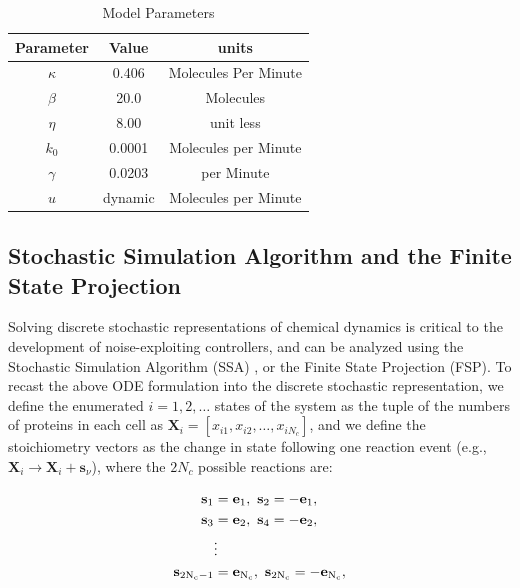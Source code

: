 \documentclass[12pt]{article}
\begin{document}
\begin{table}[]
\caption{Model Parameters}
\begin{center}
\begin{tabular}{|c|c|c|}
\hline
Parameter & Value   & units                     \\ \hline
$\kappa$         & 0.406   & Molecules Per Minute \\
$\beta$          & 20.0    & Molecules            \\
$\eta $           & 8.00    & unit less          \\
$k_0$           & 0.0001  & Molecules per Minute \\
$\gamma$         & 0.0203  & per Minute         \\
$u$              & dynamic & Molecules per Minute \\ \hline
\end{tabular}
\label{table}
\end{center}
\vspace{-0.2in}
\end{table}

\subsection{Stochastic Simulation Algorithm and the Finite State Projection}
Solving discrete stochastic representations of chemical dynamics is critical to the development of noise-exploiting controllers, and can be analyzed using the Stochastic Simulation Algorithm (SSA) , or the Finite State Projection (FSP).
To recast the above ODE formulation into the discrete stochastic representation, we define the enumerated $i = 1,2,\ldots$ states of the system as the tuple of the numbers of proteins in each cell as $\mathbf{X}_i = [x_{i1},x_{i2},\ldots,x_{iN_c}]$, and we define the stoichiometry vectors as the change in state following one reaction event (e.g., $\mathbf{X}_i \rightarrow \mathbf{X}_i + \mathbf{s}_\nu$), where the $2N_c$ possible reactions are:
 
\begin{align}
\mathbf{s}_1 &= \mathbf{e}_1,\ \mathbf{s}_2 = -\mathbf{e}_1,\nonumber\\ 
\mathbf{s}_3 &= \mathbf{e}_2,\ \mathbf{s}_4 = -\mathbf{e}_2,\nonumber\\
&\vdots \nonumber\\ 
\mathbf{s}_{\rm 2N_c-1} &= \mathbf{e}_{\rm N_c},\ \mathbf{s}_{\rm 2N_c} = -\mathbf{e}_{\rm N_c}, \label{Stochs}
 \end{align}
 
\end{document}
